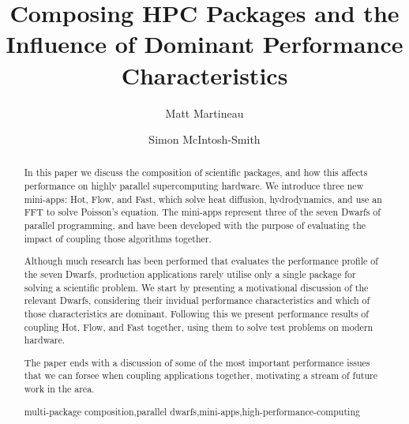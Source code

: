 \documentclass[runningheads,a4paper]{llncs}
\newcommand{\keywords}[1]{\par\addvspace\baselineskip
\noindent\keywordname\enspace\ignorespaces#1}
\begin{document}
\mainmatter  %

\title{Composing HPC Packages and the Influence of Dominant Performance Characteristics}


\author{Matt Martineau \and Simon McIntosh-Smith}
%


%
%

\maketitle


\begin{abstract}
  In this paper we discuss the composition of scientific packages, and how this affects performance on highly parallel supercomputing hardware. We introduce three new mini-apps: Hot, Flow, and Fast, which solve heat diffusion, hydrodynamics, and use an FFT to solve Poisson's equation. The mini-apps represent three of the seven Dwarfs of parallel programming, and have been developed with the purpose of evaluating the impact of coupling those algorithms together.

  Although much research has been performed that evaluates the performance profile of the seven Dwarfs, production applications rarely utilise only a single package for solving a scientific problem. We start by presenting a motivational discussion of the relevant Dwarfs, considering their invidual performance characteristics and which of those characteristics are dominant. Following this we present performance results of coupling Hot, Flow, and Fast together, using them to solve test problems on modern hardware.  

  The paper ends with a discussion of some of the most important performance issues that we can forsee when coupling applications together, motivating a stream of future work in the area.

  \keywords{multi-package composition,parallel dwarfs,mini-apps,high-performance-computing}
\end{abstract}
\end{document}
